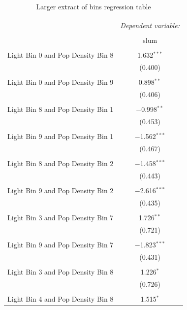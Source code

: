 \begin{table}[!htbp] \centering 
  \caption{Larger extract of bins regression table} 
  \label{appendix Bins Regression Table} 
\begin{tabular}{@{\extracolsep{5pt}}lc} 
\\[-1.8ex]\hline 
\hline \\[-1.8ex] 
 & \multicolumn{1}{c}{\textit{Dependent variable:}} \\ 
\cline{2-2} 
\\[-1.8ex] & slum \\ 
\hline \\[-1.8ex] 
Light Bin 0 and Pop Density Bin 8 & 1.632$^{***}$ \\ 
  & (0.400) \\ 
  & \\ 
 Light Bin 0 and Pop Density Bin 9 & 0.898$^{**}$ \\ 
  & (0.406) \\ 
  & \\ 
 Light Bin 8 and Pop Density Bin 1 & $-$0.998$^{**}$ \\ 
  & (0.453) \\ 
  & \\ 
 Light Bin 9 and Pop Density Bin 1 & $-$1.562$^{***}$ \\ 
  & (0.467) \\ 
  & \\ 
 Light Bin 8 and Pop Density Bin 2 & $-$1.458$^{***}$ \\ 
  & (0.443) \\ 
  & \\ 
 Light Bin 9 and Pop Density Bin 2 & $-$2.616$^{***}$ \\ 
  & (0.435) \\ 
  & \\ 
 Light Bin 3 and Pop Density Bin 7 & 1.726$^{**}$ \\ 
  & (0.721) \\ 
  & \\ 
 Light Bin 9 and Pop Density Bin 7 & $-$1.823$^{***}$ \\ 
  & (0.431) \\ 
  & \\ 
 Light Bin 3 and Pop Density Bin 8 & 1.226$^{*}$ \\ 
  & (0.726) \\ 
  & \\ 
 Light Bin 4 and Pop Density Bin 8 & 1.515$^{*}$ \\ 

\end{tabular}
\end{table}
